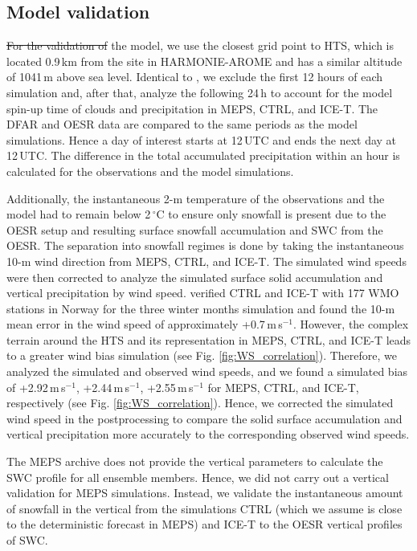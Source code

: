 \documentclass{ametsocV5}
\providecommand{\DIFadd}[1]{{\protect\color{blue}\uwave{#1}}} %
\providecommand{\DIFdel}[1]{{\protect\color{red}\sout{#1}}}                      %
\providecommand{\DIFaddbegin}{} %
\providecommand{\DIFaddend}{} %
\providecommand{\DIFdelbegin}{} %
\providecommand{\DIFdelend}{} %
\newcommand{\DIFscaledelfig}{0.5}
\newlength{\DIFdelgraphicswidth} %
\newlength{\DIFdelgraphicsheight} %
\newcommand{\DIFaddincludegraphics}[2][]{{\color{blue}\fbox{\DIFOincludegraphics[#1]{#2}}}} %
\newcommand{\DIFdelincludegraphics}[2][]{%
\sbox{\DIFdelgraphicsbox}{\DIFOincludegraphics[#1]{#2}}%
\settoboxwidth{\DIFdelgraphicswidth}{\DIFdelgraphicsbox} %
\settoboxtotalheight{\DIFdelgraphicsheight}{\DIFdelgraphicsbox} %
\scalebox{\DIFscaledelfig}{%
\parbox[b]{\DIFdelgraphicswidth}{\usebox{\DIFdelgraphicsbox}\\[-\baselineskip] \rule{\DIFdelgraphicswidth}{0em}}\llap{\resizebox{\DIFdelgraphicswidth}{\DIFdelgraphicsheight}{%
\setlength{\unitlength}{\DIFdelgraphicswidth}%
\begin{picture}(1,1)%
\thicklines\linethickness{2pt} %
{\color[rgb]{1,0,0}\put(0,0){\framebox(1,1){}}}%
{\color[rgb]{1,0,0}\put(0,0){\line( 1,1){1}}}%
{\color[rgb]{1,0,0}\put(0,1){\line(1,-1){1}}}%
\end{picture}%
}\hspace*{3pt}}} %
} %
\DeclareRobustCommand{\DIFaddbegin}{\DIFOaddbegin \let\includegraphics\DIFaddincludegraphics} %
\DeclareRobustCommand{\DIFaddend}{\DIFOaddend \let\includegraphics\DIFOincludegraphics} %
\DeclareRobustCommand{\DIFdelbegin}{\DIFOdelbegin \let\includegraphics\DIFdelincludegraphics} %
\DeclareRobustCommand{\DIFdelend}{\DIFOaddend \let\includegraphics\DIFOincludegraphics} %
\begin{document}
	\subsection{Model validation}\label{sec:methodology:MEPS_vali}
		\DIFdelbegin \DIFdel{For the validation of }\DIFdelend \DIFaddbegin \DIFadd{To validate }\DIFaddend the model, we use the closest grid point to HTS, which is located 0.9\,km from the site in HARMONIE-AROME and has a similar altitude of 1041\,m above sea level. Identical to \citet{engdahl_effects_2020}, we exclude the first 12 hours of each simulation and, after that, analyze the following 24\,h to account for the model spin-up time of clouds and precipitation in MEPS, CTRL, and ICE-T. The DFAR and OESR data are compared to the same periods as the model simulations. Hence a day of interest starts at 12\,UTC and ends the next day at 12\,UTC. The difference in the total accumulated precipitation within an hour is calculated for the observations and the model simulations. 

		Additionally, the instantaneous 2-m temperature of the observations and the model had to remain below 2\,$^{\circ}$C to ensure only snowfall is present due to the OESR setup and resulting surface snowfall accumulation and SWC from the OESR. The separation into snowfall regimes is done by taking the instantaneous 10-m wind direction from MEPS, CTRL, and ICE-T. The simulated wind speeds were then corrected to analyze the simulated surface solid accumulation and vertical precipitation by wind speed. \citet{engdahl_effects_2020} verified CTRL and ICE-T with 177 WMO stations in Norway for the three winter months simulation and found the 10-m mean error in the wind speed of approximately +0.7\,m\,s$^{-1}$. However, the complex terrain around the HTS and its representation in MEPS, CTRL, and ICE-T leads to a greater wind bias simulation (see Fig. \ref{fig:WS_correlation}). Therefore, we analyzed the simulated and observed wind speeds, and we found a simulated bias of +2.92\,m\,s$^{-1}$, +2.44\,m\,s$^{-1}$, +2.55\,m\,s$^{-1}$ for MEPS, CTRL, and ICE-T, respectively (see Fig. \ref{fig:WS_correlation}). Hence, we corrected the simulated wind speed in the postprocessing to compare the solid surface accumulation and vertical precipitation more accurately to the corresponding observed wind speeds. 

		
		The MEPS archive does not provide the vertical parameters to calculate the SWC profile for all ensemble members. Hence, we did not carry out a vertical validation for MEPS simulations. Instead, we validate the instantaneous amount of snowfall in the vertical from the simulations CTRL (which we assume is close to the deterministic forecast in MEPS) and ICE-T to the OESR vertical profiles of SWC.
\end{document}

